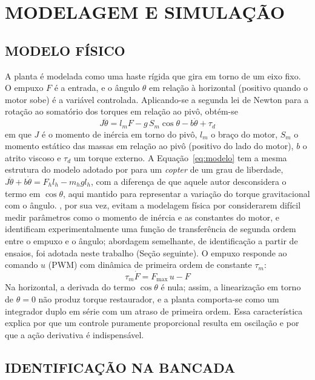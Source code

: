 \chapter{MODELAGEM E SIMULAÇÃO}\label{cap:processo}

\section{MODELO FÍSICO}

A planta é modelada como uma haste rígida que gira em torno de um eixo fixo. O empuxo $F$ é a entrada, e o ângulo $\theta$ em relação à horizontal (positivo quando o motor sobe) é a variável controlada. Aplicando-se a segunda lei de Newton para a rotação ao somatório dos torques em relação ao pivô, obtém-se
\begin{equation}
 J\ddot\theta=l_mF-g\,S_m\cos\theta-b\dot\theta+\tau_d
 \label{eq:modelo}
\end{equation}
em que $J$ é o momento de inércia em torno do pivô, $l_m$ o braço do motor, $S_m$ o momento estático das massas em relação ao pivô (positivo do lado do motor), $b$ o atrito viscoso e $\tau_d$ um torque externo. A Equação~\ref{eq:modelo} tem a mesma estrutura do modelo adotado por  para um \textit{copter} de um grau de liberdade, $J\ddot\theta+b\dot\theta=F_hl_h-m_hgl_h$, com a diferença de que aquele autor desconsidera o termo em $\cos\theta$, aqui mantido para representar a variação do torque gravitacional com o ângulo. , por sua vez, evitam a modelagem física por considerarem difícil medir parâmetros como o momento de inércia e as constantes do motor, e identificam experimentalmente uma função de transferência de segunda ordem entre o empuxo e o ângulo; abordagem semelhante, de identificação a partir de ensaios, foi adotada neste trabalho (Seção seguinte). O empuxo responde ao comando $u$ (PWM) com dinâmica de primeira ordem de constante $\tau_m$:
\begin{equation}
 \tau_m\dot F=F_{\max}\,u-F
\end{equation}
Na horizontal, a derivada do termo $\cos\theta$ é nula; assim, a linearização em torno de $\theta=0$ não produz torque restaurador, e a planta comporta-se como um integrador duplo em série com um atraso de primeira ordem. Essa característica explica por que um controle puramente proporcional resulta em oscilação e por que a ação derivativa é indispensável.

\section{IDENTIFICAÇÃO NA BANCADA}

